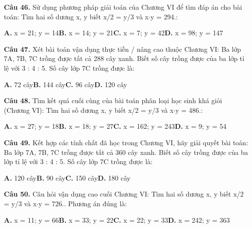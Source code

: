 \documentclass[11pt,a4paper]{article}
\begin{document}
\textbf{\color{primary} Câu 46.} Sử dụng phương pháp giải toán của Chương VI để tìm đáp án cho bài toán: Tìm hai số dương x, y biết x/2 = y/3 và x$\cdot$y = 294.:\par
\hspace*{1.5em}\textbf{A.} x = 21; y = 14\quad\quad \textbf{B.} x = 14; y = 21\quad\quad \textbf{C.} x = 7; y = 42\quad\quad \textbf{D.} x = 98; y = 147\par\vspace{2pt}
\textbf{\color{primary} Câu 47.} Xét bài toán vận dụng thực tiễn / nâng cao thuộc Chương VI: Ba lớp 7A, 7B, 7C trồng được tất cả 288 cây xanh. Biết số cây trồng được của ba lớp tỉ lệ với 3 : 4 : 5. Số cây lớp 7C trồng được là:\par
\hspace*{1.5em}\textbf{A.} 72 cây\quad\quad \textbf{B.} 144 cây\quad\quad \textbf{C.} 96 cây\quad\quad \textbf{D.} 120 cây\par\vspace{2pt}
\textbf{\color{primary} Câu 48.} Tìm kết quả cuối cùng của bài toán phân loại học sinh khá giỏi (Chương VI): Tìm hai số dương x, y biết x/2 = y/3 và x$\cdot$y = 486.:\par
\hspace*{1.5em}\textbf{A.} x = 27; y = 18\quad\quad \textbf{B.} x = 18; y = 27\quad\quad \textbf{C.} x = 162; y = 243\quad\quad \textbf{D.} x = 9; y = 54\par\vspace{2pt}
\textbf{\color{primary} Câu 49.} Kết hợp các tính chất đã học trong Chương VI, hãy giải quyết bài toán: Ba lớp 7A, 7B, 7C trồng được tất cả 360 cây xanh. Biết số cây trồng được của ba lớp tỉ lệ với 3 : 4 : 5. Số cây lớp 7C trồng được là:\par
\hspace*{1.5em}\textbf{A.} 120 cây\quad\quad \textbf{B.} 90 cây\quad\quad \textbf{C.} 150 cây\quad\quad \textbf{D.} 180 cây\par\vspace{2pt}
\textbf{\color{primary} Câu 50.} Câu hỏi vận dụng cao cuối Chương VI: Tìm hai số dương x, y biết x/2 = y/3 và x$\cdot$y = 726.. Phương án đúng là:\par
\hspace*{1.5em}\textbf{A.} x = 11; y = 66\quad\quad \textbf{B.} x = 33; y = 22\quad\quad \textbf{C.} x = 22; y = 33\quad\quad \textbf{D.} x = 242; y = 363\par\vspace{2pt}
\end{document}
